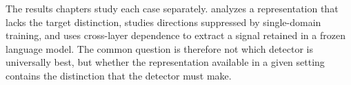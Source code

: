 The results chapters study each case separately.  analyzes
a representation that lacks the target distinction,
 studies directions suppressed by
single-domain training, and  uses cross-layer
dependence to extract a signal retained in a frozen language model. The common
question is therefore not which detector is universally best, but whether the
representation available in a given setting contains the distinction that the
detector must make.
